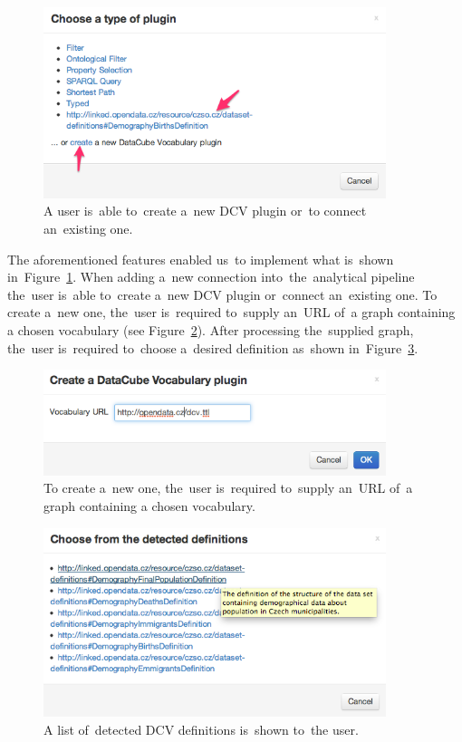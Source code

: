 \begin{figure}
	\centering
	\includegraphics[width=100mm]{img/choose-plugin.png}
	\caption{A user is~able to~create a~new DCV plugin or~to connect an~existing one.}
	\label{fig:choose-plugin}
\end{figure}

The aforementioned features enabled us~to implement what is~shown in~Figure~\ref{fig:choose-plugin}. When adding a~new connection into~the~analytical 
pipeline the~user is~able to~create a~new DCV plugin or~connect an~existing one. 
To create a~new one, the~user is~required to~supply an~URL of~a graph containing 
a chosen vocabulary (see Figure~\ref{fig:create-plugin}). After processing the~supplied graph, the~user is~required to~choose a~desired definition as~shown in~Figure~\ref{fig:choose-def}.

\begin{figure}
	\centering
	\includegraphics[width=100mm]{img/create-dcv.png}
	\caption{To create a~new one, the~user is~required to~supply an~URL of~a graph containing 
a chosen vocabulary.}
	\label{fig:create-plugin}
\end{figure}


\begin{figure}
	\centering
	\includegraphics[width=100mm]{img/choose-def.png}
	\caption{A list of~detected DCV definitions is~shown to~the user.}
	\label{fig:choose-def}
\end{figure}

